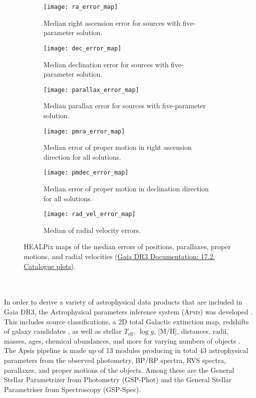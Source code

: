 \documentclass[a4paper,11pt]{article}
\begin{document}
\begin{figure}
 \centering
 \begin{subfigure}[t]{0.33\textwidth}
  \texttt{[image: ra\_error\_map]}
  \caption{Median right ascension error for sources with five-parameter solution.}
  \label{fig:ra_error_map}
 \end{subfigure}\hfill
 \begin{subfigure}[t]{0.33\textwidth}
  \texttt{[image: dec\_error\_map]}
  \caption{Median declination error for sources with five-parameter solution.}
  \label{fig:dec_error_map}
 \end{subfigure}\hfill
 \begin{subfigure}[t]{0.33\textwidth}
  \texttt{[image: parallax\_error\_map]}
  \caption{Median parallax error for sources with five-parameter solution.}
  \label{fig:parallax_error_map}
 \end{subfigure}
 \medskip
 \begin{subfigure}[t]{0.33\textwidth}
  \texttt{[image: pmra\_error\_map]}
  \caption{Median error of proper motion in right ascension direction for all solutions.}
  \label{fig:pmra_error_map}
 \end{subfigure}\hfill
 \begin{subfigure}[t]{0.33\textwidth}
  \texttt{[image: pmdec\_error\_map]}
  \caption{Median error of proper motion in declination direction for all solutions.}
  \label{fig:pmdec_error_map}
 \end{subfigure}\hfill
 \begin{subfigure}[t]{0.33\textwidth}
  \texttt{[image: rad\_vel\_error\_map]}
  \caption{Median of radial velocity errors.}
  \label{fig:rad_vel_error_map}
 \end{subfigure}
 \caption[Median errors of Gaia DR3 astrometry]{HEALPix maps of the median errors of positions, parallaxes, proper motions, and radial velocities (\href{https://gea.esac.esa.int/archive/documentation/GDR3/Catalogue_consolidation/chap_cu9gat/sec_cu9gat_catplots/}{Gaia DR3 Documentation: 17.2. Catalogue plots}).}
 \label{fig:gaia_astr_error}
\end{figure}\\ \\
%
In order to derive a variety of astrophysical data products that are included in Gaia DR3, the Astrophysical parameters inference system (\textsc{Apsis}) was developed \citep{creevey23,bailerjones13}. This includes source classifications, a 2D total Galactic extinction map, redshifts of galaxy candidates \citep{delchambre23}, as well as stellar $T_\mathrm{eff}$, $\log{g}$, [M/H], distances, radii, masses, ages, chemical abundances, and more for varying numbers of objects \citep{fouesneau23}. The Apsis pipeline is made up of 13 modules producing in total 43 astrophysical parameters from the observed photometry, BP/RP spectra, RVS spectra, parallaxes, and proper motions of the objects. Among these are the General Stellar Parametrizer from Photometry (GSP-Phot) and the General Stellar Parametriser from Spectroscopy (GSP-Spec).\\ \\
\end{document}
